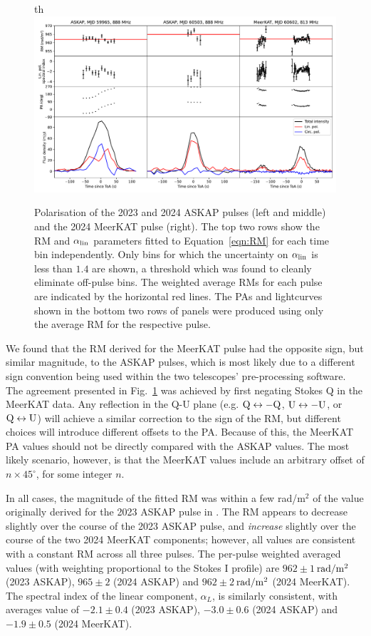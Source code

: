 \documentclass[fleqn,usenatbib]{mnras}
\newcommand{\Fig}{Fig.}
\newcommand{\Eqn}{Equation}
\begin{document}
\begin{figure}{th}
    \centering
    \includegraphics[width=0.98\linewidth]{RM.pdf}
    \caption{Polarisation of the 2023 and 2024 ASKAP pulses (left and middle) and the 2024 MeerKAT pulse (right). The top two rows show the RM and $\alpha_{\rm lin}$ parameters fitted to \Eqn~\ref{eqn:RM} for each time bin independently. Only bins for which the uncertainty on $\alpha_{\rm lin}$ is less than $1.4$ are shown, a threshold which was found to cleanly eliminate off-pulse bins. The weighted average RMs for each pulse are indicated by the horizontal red lines. The PAs and lightcurves shown in the bottom two rows of panels were produced using only the average RM for the respective pulse.}
    \label{fig:RM}
\end{figure}

We found that the RM derived for the MeerKAT pulse had the opposite sign, but similar magnitude, to the ASKAP pulses, which is most likely due to a different sign convention being used within the two telescopes' pre-processing software.
The agreement presented in \Fig~\ref{fig:RM} was achieved by first negating Stokes Q in the MeerKAT data.
Any reflection in the Q-U plane (e.g. ${\rm Q} \leftrightarrow -{\rm Q}$, ${\rm U} \leftrightarrow -{\rm U}$, or ${\rm Q} \leftrightarrow {\rm U}$) will achieve a similar correction to the sign of the RM, but different choices will introduce different offsets to the PA.
Because of this, the MeerKAT PA values should not be directly compared with the ASKAP values.
The most likely scenario, however, is that the MeerKAT values include an arbitrary offset of $n \times 45^\circ$, for some integer $n$.

In all cases, the magnitude of the fitted RM was within a few rad/m$^2$ of the value originally derived for the 2023 ASKAP pulse in .
The RM appears to decrease slightly over the course of the 2023 ASKAP pulse, and \emph{increase} slightly over the course of the two 2024 MeerKAT components; however, all values are consistent with a constant RM across all three pulses.
The per-pulse weighted averaged values (with weighting proportional to the Stokes I profile) are $962 \pm 1$\,${\rm rad}/{\rm m}^2$ (2023 ASKAP), $965 \pm 2$ (2024 ASKAP) and $962 \pm 2$\,${\rm rad}/{\rm m}^2$ (2024 MeerKAT).
The spectral index of the linear component, $\alpha_L$, is similarly consistent, with averages value of $-2.1 \pm 0.4$ (2023 ASKAP), $-3.0 \pm 0.6$ (2024 ASKAP) and $-1.9 \pm 0.5$ (2024 MeerKAT).
\end{document}

